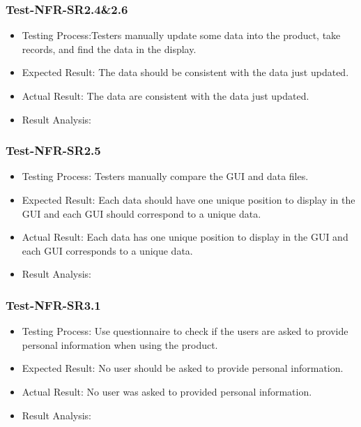 \documentclass[12pt, titlepage]{article}
\begin{document}
\subsubsection{Test-NFR-SR2.4\&2.6}
\begin{itemize}
    \item Testing Process:Testers manually update some data into the product, take records, and find the data in the display.
    \item Expected Result: The data should be consistent with the data just updated.
    \item Actual Result: The data are consistent with the data just updated. 
    \item Result Analysis: \pass
\end{itemize}



\subsubsection{Test-NFR-SR2.5}
\begin{itemize}
    \item Testing Process: Testers manually compare the GUI and data files.  
    \item Expected Result: Each data should have one unique position to display in the GUI and each GUI should correspond to a unique data.  
    \item Actual Result: Each data has one unique position to display in the GUI and each GUI corresponds to a unique data. 
    \item Result Analysis: \pass
\end{itemize}




\subsubsection{Test-NFR-SR3.1}
\begin{itemize}
    \item Testing Process: Use questionnaire to check if the users are asked to provide personal information when using the product.
    \item Expected Result: No user should be asked to provide personal information.
    \item Actual Result: No user was asked to provided personal information.
    \item Result Analysis: \pass
\end{itemize}
\end{document}
